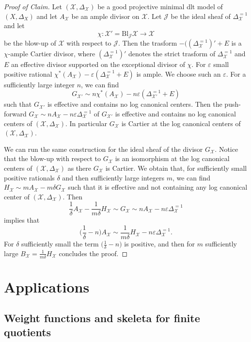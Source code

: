 \documentclass{amsart}%
\numberwithin{equation}{subsection}
\theoremstyle{plain2}
\theoremstyle{definition2}
\theoremstyle{stepstyle}
\theoremstyle{point}
\theoremstyle{subpoint}
\newcommand{\cX}{\ensuremath{\mathscr{X}}}
\begin{document}
\begin{proof}[Proof of Claim]
Let $(\cX,\Delta_{\cX})$ be a good projective minimal dlt model of $(X,\Delta_X)$ and let $A_\cX$ be an ample divisor on $\cX$. Let $\mathcal{J}$ be the ideal sheaf of $\Delta_{\cX}^{=1}$ and let $$\chi: \cX' = \text{Bl}_\mathcal{J}\cX \rightarrow \cX$$ be the blow-up of $\cX$ with respect to $\mathcal{J}$. Then the trasform $- ((\Delta_{\cX}^{=1})'+ E$ is a $\chi$-ample Cartier divisor, where $(\Delta_{\cX}^{=1})'$ denotes the strict trasform of $\Delta_{\cX}^{=1}$ and $E$ an effective divisor supported on the exceptional divisor of $\chi$. For $\varepsilon$ small positive rational $\chi^*(A_\cX) - \varepsilon (\Delta_{\cX}^{=1} + E) $ is ample. We choose such an $\varepsilon$. For a sufficiently large integer $n$, we can find $$G_{\cX'} \sim n \chi^*(A_\cX) - n \varepsilon (\Delta_{\cX'}^{=1} + E)$$ such that $G_{\cX'}$ is effective and contains no log canonical centers. Then the push-forward $G_\cX \sim n A_\cX - n \varepsilon \Delta_{\cX}^{=1}$ of $G_{\cX'}$ is effective and contains no log canonical centers of $(\cX,\Delta_{\cX})$. In particular $G_\cX$ is Cartier at the log canonical centers of $(\cX,\Delta_{\cX})$.

We can run the same construction for the ideal sheaf of the divisor $G_\cX$. Notice that the blow-up with respect to $G_\cX$ is an isomorphism at the log canonical centers of $(\cX,\Delta_{\cX})$ as there $G_\cX$ is Cartier. We obtain that, for sufficiently small positive rationals $\delta$ and then sufficiently large integers $m$, we can find $H_\cX \sim m A_\cX - m \delta G_\cX$ such that it is effective and not containing any log canonical center of $(\cX,\Delta_{\cX})$. Then $$\frac{1}{\delta}A_\cX - \frac{1}{m \delta}H_\cX \sim G_\cX \sim n A_\cX - n \varepsilon \Delta_{\cX}^{=1} $$ implies that  $$ \Big(\frac{1}{\delta} - n\Big) A_\cX  \sim \frac{1}{m \delta} H_\cX - n \varepsilon  \Delta_{\cX}^{=1}.$$ For $\delta$ sufficiently small the term $\big(\frac{1}{\delta} - n\big)$ is positive, and then for $m$ sufficiently large $B_\cX = \frac{1}{m \delta} H_\cX$ concludes the proof.
\end{proof}

\section{Applications}\label{sec hkahler}
\subsection{Weight functions and skeleta for finite quotients}
\end{document}
